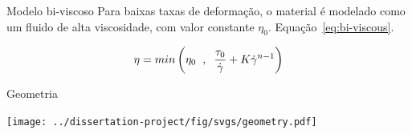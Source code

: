 \begin{frame}{Modelo bi-viscoso}
    Para baixas taxas de deformação, o material é modelado como um fluido de alta viscosidade, com valor constante $\eta_0$. Equação~\ref{eq:bi-viscous}.

    \begin{equation} \label{eq:bi-viscous}
        \eta = min \left( \eta_0 \hspace{0.2cm} , \hspace{0.2cm} \frac{\tau_0}{\dot{\gamma}} + K\dot{\gamma}^{n-1}  \right)
    \end{equation}

\end{frame}



\begin{frame}{Geometria}
    \begin{minipage}[c]{0.58\textwidth}
        \texttt{[image: ../dissertation-project/fig/svgs/geometry.pdf]}
    \end{minipage}
    \hfill
    \begin{minipage}[c]{0.38\textwidth}
    \end{minipage}
\end{frame}


